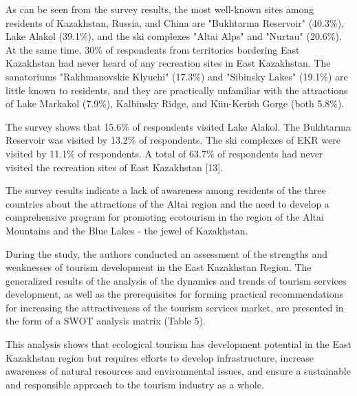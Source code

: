 \begin{multicols}{2}
As can be seen from the survey results, the most well-known sites among
residents of Kazakhstan, Russia, and China are "Bukhtarma Reservoir"
(40.3\%), Lake Alakol (39.1\%), and the ski complexes "Altai Alps" and
"Nurtau" (20.6\%). At the same time, 30\% of respondents from
territories bordering East Kazakhstan had never heard of any recreation
sites in East Kazakhstan. The sanatoriums "Rakhmanovskie Klyuchi"
(17.3\%) and "Sibinsky Lakes" (19.1\%) are little known to residents,
and they are practically unfamiliar with the attractions of Lake
Markakol (7.9\%), Kalbinsky Ridge, and Kiin-Kerish Gorge (both 5.8\%).

The survey shows that 15.6\% of respondents visited Lake Alakol. The
Bukhtarma Reservoir was visited by 13.2\% of respondents. The ski
complexes of EKR were visited by 11.1\% of respondents. A total of
63.7\% of respondents had never visited the recreation sites of East
Kazakhstan {[}13{]}.

The survey results indicate a lack of awareness among residents of the
three countries about the attractions of the Altai region and the need
to develop a comprehensive program for promoting ecotourism in the
region of the Altai Mountains and the Blue Lakes - the jewel of
Kazakhstan.

During the study, the authors conducted an assessment of the strengths
and weaknesses of tourism development in the East Kazakhstan Region. The
generalized results of the analysis of the dynamics and trends of
tourism services development, as well as the prerequisites for forming
practical recommendations for increasing the attractiveness of the
tourism services market, are presented in the form of a SWOT analysis
matrix (Table 5).

This analysis shows that ecological tourism has development potential in
the East Kazakhstan region but requires efforts to develop
infrastructure, increase awareness of natural resources and
environmental issues, and ensure a sustainable and responsible approach
to the tourism industry as a whole.
\end{multicols}

